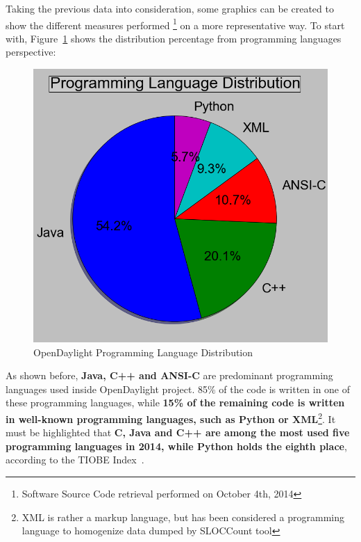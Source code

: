 \documentclass[a4paper, 12pt]{book}
\begin{document}
Taking the previous data into consideration, some graphics can be created to show the different measures performed \footnote{Software Source Code retrieval performed on October 4th, 2014} on a more representative way. To start with, Figure~\ref{fig:odl_prog_dist_diagram} shows the distribution percentage from programming languages perspective:
\begin{center}
 \begin{figure}
 \begin{center}
   \includegraphics[width=15cm]{img/sloc-distritbution-01.png}
   \caption{OpenDaylight Programming Language Distribution}
   \label{fig:odl_prog_dist_diagram}
 \end{center}
 \end{figure}
\end{center}
As shown before, \textbf{Java, C++ and ANSI-C} are predominant programming languages used inside OpenDaylight project. 85\% of the code is written in one of these programming languages, while \textbf{15\% of the remaining code is written in well-known programming languages, such as Python or XML}\footnote{XML is rather a markup language, but has been considered a programming language to homogenize data dumped by SLOCCount tool}. It must be highlighted that \textbf{C, Java and C++ are among the most used five programming languages in 2014, while Python holds the eighth place}, according to the TIOBE Index~\cite{TiobeIndex}.\\
\end{document}
